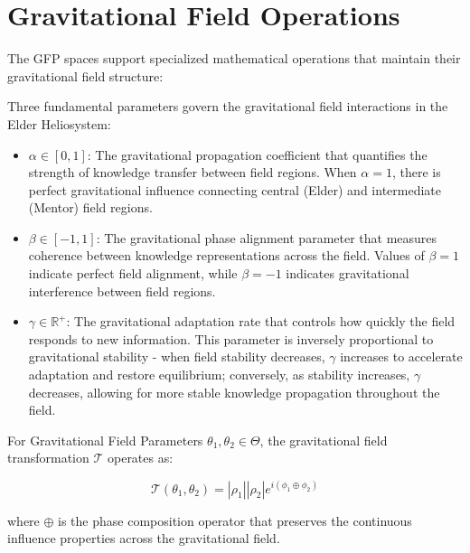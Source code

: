 \section{Gravitational Field Operations}

The GFP spaces support specialized mathematical operations that maintain their gravitational field structure:

\begin{definition}
Three fundamental parameters govern the gravitational field interactions in the Elder Heliosystem:

\begin{itemize}
    \item $\alpha \in [0,1]$: The gravitational propagation coefficient that quantifies the strength of knowledge transfer between field regions. When $\alpha = 1$, there is perfect gravitational influence connecting central (Elder) and intermediate (Mentor) field regions.
    
    \item $\beta \in [-1,1]$: The gravitational phase alignment parameter that measures coherence between knowledge representations across the field. Values of $\beta = 1$ indicate perfect field alignment, while $\beta = -1$ indicates gravitational interference between field regions.
    
    \item $\gamma \in \mathbb{R}^+$: The gravitational adaptation rate that controls how quickly the field responds to new information. This parameter is inversely proportional to gravitational stability - when field stability decreases, $\gamma$ increases to accelerate adaptation and restore equilibrium; conversely, as stability increases, $\gamma$ decreases, allowing for more stable knowledge propagation throughout the field.
\end{itemize}
\end{definition}

\begin{theorem}
For Gravitational Field Parameters $\theta_1, \theta_2 \in \Theta$, the gravitational field transformation $\mathcal{T}$ operates as:

\begin{equation}
\mathcal{T}(\theta_1, \theta_2) = |\rho_1||\rho_2|e^{i(\phi_1 \oplus \phi_2)}
\end{equation}

where $\oplus$ is the phase composition operator that preserves the continuous influence properties across the gravitational field.
\end{theorem}

